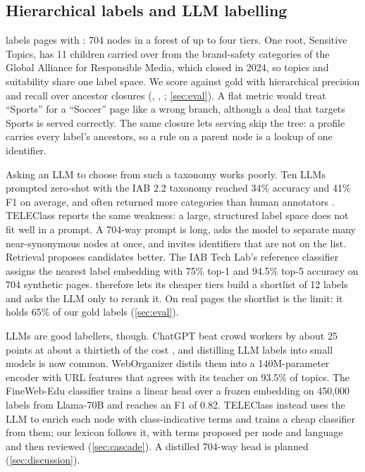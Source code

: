 \subsection{Hierarchical labels and LLM labelling}\label{sec:related-hier}

\sys{} labels pages with \iab{} \citep{iabtechlab2024content}: 704 nodes in a forest of up to four tiers. One root, Sensitive Topics, has 11 children carried over from the brand-safety categories of the Global Alliance for Responsible Media, which closed in 2024, so topics and suitability share one label space. We score against gold with hierarchical precision and recall over ancestor closures (\hP, \hR, \hF; \cref{sec:eval}). A flat metric would treat ``Sports'' for a ``Soccer'' page like a wrong branch, although a deal that targets Sports is served correctly. The same closure lets serving skip the tree: a profile carries every label's ancestors, so a rule on a parent node is a lookup of one identifier.

Asking an LLM to choose from such a taxonomy works poorly. Ten LLMs prompted zero-shot with the IAB 2.2 taxonomy reached 34\% accuracy and 41\% F1 on average, and often returned more categories than human annotators \citep{kamen2025order}. TELEClass \citep{zhang2025teleclass} reports the same weakness: a large, structured label space does not fit well in a prompt. A 704-way prompt is long, asks the model to separate many near-synonymous nodes at once, and invites identifiers that are not on the list. Retrieval proposes candidates better. The IAB Tech Lab's reference classifier \citep{iabtechlab2026iab} assigns the nearest label embedding with 75\% top-1 and 94.5\% top-5 accuracy on 704 synthetic pages. \sys{} therefore lets its cheaper tiers build a shortlist of 12 labels and asks the LLM only to rerank it. On real pages the shortlist is the limit: it holds 65\% of our gold labels (\cref{sec:eval}).

LLMs are good labellers, though. ChatGPT beat crowd workers by about 25 points at about a thirtieth of the cost \citep{gilardi2023chatgpt}, and distilling LLM labels into small models is now common. WebOrganizer \citep{wettig2025organize} distils them into a 140M-parameter encoder with URL features that agrees with its teacher on 93.5\% of topics. The FineWeb-Edu classifier \citep{huggingfacefw2024fineweb} trains a linear head over a frozen embedding on 450,000 labels from Llama-70B and reaches an F1 of 0.82. TELEClass instead uses the LLM to enrich each node with class-indicative terms and trains a cheap classifier from them; our lexicon follows it, with terms proposed per node and language and then reviewed (\cref{sec:cascade}). A distilled 704-way head is planned (\cref{sec:discussion}).

